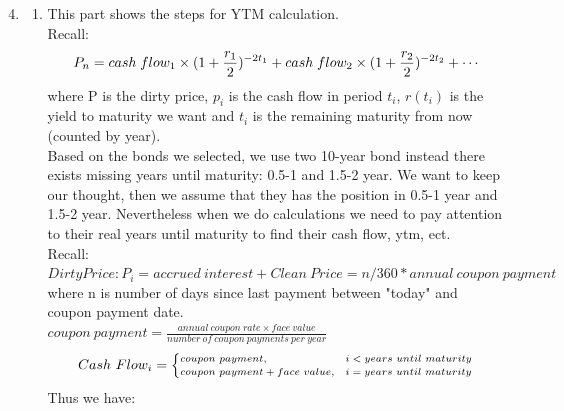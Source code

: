 \documentclass[10pt]{article}
\begin{document}
\begin{enumerate}
\setcounter{enumi}{3} 
    \item 
    \begin{enumerate}
        \item 
            This part shows the steps for YTM calculation. \\
            Recall: 
            $$
            \begin{scriptsize}
            P_n = cash \ flow_1 \times (1 + \frac{r_1}{2})^{-2 t_1} + cash \ flow_2 \times (1 + \frac{r_2}{2})^{-2 t_2} + \cdots
            \end{scriptsize}
            $$ 
            where P is the dirty price, $p_i$ is the cash flow in period $t_i$, $r(t_i)$ is the yield to maturity we want and $t_i$ is the remaining maturity from now (counted by year). \\
            Based on the bonds we selected, we use two 10-year bond instead there exists missing years until maturity: 0.5-1 and 1.5-2 year. We want to keep our thought, then we assume that they has the position in 0.5-1 year and 1.5-2 year. Nevertheless when we do calculations we need to pay attention to their real years until maturity to find their cash flow, ytm, ect. \\
            Recall: $Dirty Price: P_i = accrued \ interest + Clean \ Price = n/360 * annual \ coupon \ payment$ where n is number of days since last payment between "today" and coupon payment date. \\
            $coupon \ payment = \frac{annual \ coupon \ rate \times face \ value}{number \ of \ coupon \ payments \ per \ year}$
            $$
            Cash \ Flow_i=
            \begin{scriptsize}
            \begin{cases}
                coupon \ payment, & i<years \ until \ maturity \\
                coupon \ payment + face \ value , & i=years \ until \ maturity
            \end{cases}
            \end{scriptsize}
            $$
            Thus we have: 
            \begin{table}[H]
                \caption{Bonds’ Yield (YTM) from the selected 11 Bonds}
\end{table}
\end{enumerate}
\end{enumerate}
\end{document}
